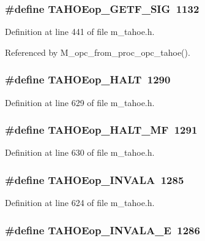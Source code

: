 \subsubsection{\setlength{\rightskip}{0pt plus 5cm}\#define TAHOEop\_\-GETF\_\-SIG~1132}\label{m__tahoe_8h_6afb6454f116a3de375285833ab2de9d}




Definition at line 441 of file m\_\-tahoe.h.

Referenced by M\_\-opc\_\-from\_\-proc\_\-opc\_\-tahoe().
\subsubsection{\setlength{\rightskip}{0pt plus 5cm}\#define TAHOEop\_\-HALT~1290}\label{m__tahoe_8h_10848c18e70bb89b28eb9796be4d5458}




Definition at line 629 of file m\_\-tahoe.h.
\subsubsection{\setlength{\rightskip}{0pt plus 5cm}\#define TAHOEop\_\-HALT\_\-MF~1291}\label{m__tahoe_8h_2195705ca956fc39390f977953a0314d}




Definition at line 630 of file m\_\-tahoe.h.
\subsubsection{\setlength{\rightskip}{0pt plus 5cm}\#define TAHOEop\_\-INVALA~1285}\label{m__tahoe_8h_c7bc6b67f673701d6b750f2a7188e165}




Definition at line 624 of file m\_\-tahoe.h.
\subsubsection{\setlength{\rightskip}{0pt plus 5cm}\#define TAHOEop\_\-INVALA\_\-E~1286}\label{m__tahoe_8h_1136154ffad419041f32ed3a5cb62edf}




